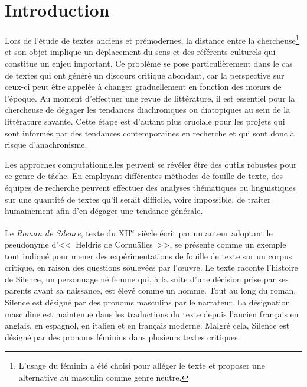\documentclass[hidelinks, 11pt, letterpaper]{article}
\newcommand{\guil}[1]{<<~{#1}~>>} %
\begin{document}




\setcounter{page}{1}

\section*{Introduction}
Lors de l'étude de textes anciens et prémodernes, la distance entre la chercheuse\footnote{L'usage du féminin a été choisi pour alléger le texte et proposer une alternative au masculin comme genre neutre.} et son objet implique un déplacement du sens et des référents culturels qui constitue un enjeu important. %
Ce problème se pose particulièrement dans le cas de textes qui ont généré un discours critique abondant, car la perspective sur ceux-ci peut être appelée à changer graduellement en fonction des m\oe urs de l'époque.
Au moment d'effectuer une revue de littérature, il est essentiel pour la chercheuse de dégager les tendances diachroniques ou diatopiques au sein de la littérature savante.
Cette étape est d'autant plus cruciale pour les projets qui sont informés par des tendances contemporaines en recherche et qui sont donc à risque d'anachronisme.

Les approches computationnelles peuvent se révéler être des outils robustes pour ce genre de tâche.
En employant différentes méthodes de fouille de texte, des équipes de recherche peuvent effectuer des analyses thématiques ou linguistiques sur une quantité de textes qu'il serait difficile, voire impossible, de traiter humainement afin d'en dégager une tendance générale.

Le \emph{Roman de Silence}, texte du XII\textsuperscript{e}~siècle écrit par un auteur adoptant le pseudonyme d'\guil{Heldris de Cornuälles}, se présente comme un exemple tout indiqué pour mener des expérimentations de fouille de texte sur un corpus critique, en raison des questions soulevées par l'\oe uvre.
Le texte raconte l'histoire de Silence, un personnage né femme qui, à la suite d'une décision prise par ses parents avant sa naissance, est élevé comme un homme.
Tout au long du roman, Silence est désigné par des pronoms masculins par le narrateur.
La désignation masculine est maintenue dans les traductions du texte depuis l'ancien français en anglais, en espagnol, en italien et en français moderne.
Malgré cela, Silence est désigné par des pronoms féminins dans plusieurs textes critiques.
\end{document}
